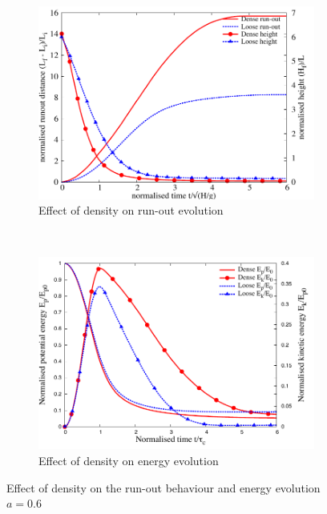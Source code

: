 \begin{figure}[tbhp]
\centering
\begin{subfigure}[b]{0.95\textwidth}
\includegraphics[width=\textwidth]{runout_height_dense_a6}
\caption{Effect of density on run-out evolution}
\label{fig:runout_height_dense_a6}
\end{subfigure}
\\
\begin{subfigure}[b]{0.95\textwidth}
\centering
\includegraphics[width=\textwidth]{Energy_dense_a6}
\caption{Effect of density on energy evolution}
\label{fig:Energy_dense_a6}
\end{subfigure}
\caption{Effect of density on the run-out behaviour and energy evolution $a = 
0.6$}
\label{fig:Density_a6}
\end{figure}

